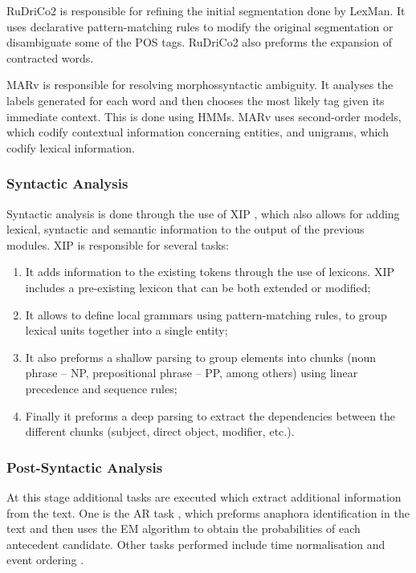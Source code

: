 \ac{RuDriCo2} is responsible for refining the initial segmentation done by
LexMan. It uses declarative pattern-matching rules to modify the original
segmentation or disambiguate some of the \ac{POS} tags. \ac{RuDriCo2} also
preforms the expansion of contracted words.

\ac{MARv} is responsible for resolving morphossyntactic ambiguity. It analyses
the labels generated for each word and then chooses the most likely tag given
its immediate context. This is done using \acp{HMM}. \ac{MARv} uses
second-order models, which codify contextual information concerning entities,
and unigrams, which codify lexical information.

\subsubsection*{Syntactic Analysis}

Syntactic analysis is done through the use of \ac{XIP} 
\citep{ait2002robustness},
which also allows for adding lexical, syntactic and semantic information to the
output of the previous modules. \ac{XIP} is responsible for several tasks:

\begin{enumerate}[label=(\roman*)]
 \item It adds information to the existing tokens through the use of lexicons.
\ac{XIP} includes a pre-existing lexicon that can be both extended or modified;
 \item It allows to define local grammars using pattern-matching rules, to group
lexical units together into a single entity;
 \item It also preforms a shallow parsing to group elements into chunks (noun
 phrase -- NP, prepositional phrase -- PP, among others) using linear precedence
 and sequence rules;
 \item Finally it preforms a deep parsing to extract the dependencies between the
different chunks (subject, direct object, modifier, etc.).
\end{enumerate}

\subsubsection*{Post-Syntactic Analysis}

At this stage additional tasks are executed which extract additional information
from the text. One is the \ac{AR} task \citep{marques2013anaphora}, which
preforms anaphora identification in the text and then uses the \ac{EM} algorithm
to obtain the probabilities of each antecedent candidate. Other tasks performed
include time normalisation \citep{mauricio2011normalizacao} and event ordering
\citep{cabrita2014ordenar}.

